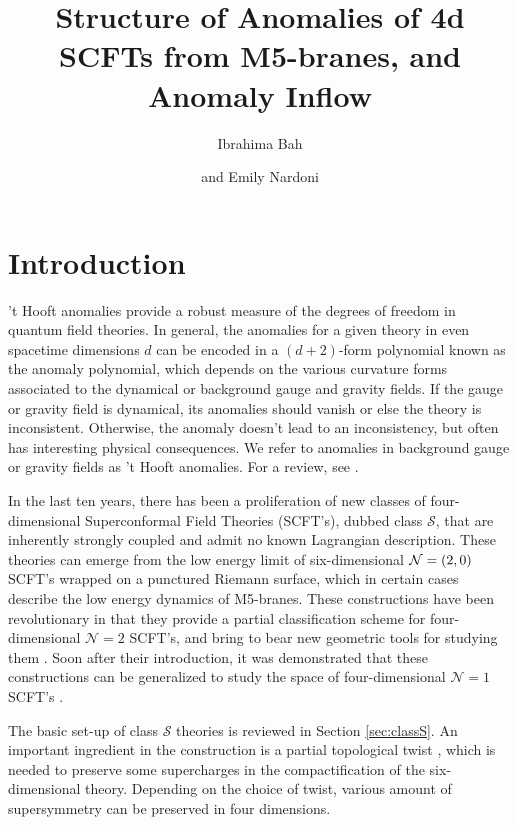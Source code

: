 \documentclass[a4paper,11pt]{article}
\title{\boldmath 	Structure of Anomalies of 4d SCFTs from M5-branes, and Anomaly Inflow}
\author[a]{Ibrahima Bah}
\author[b]{and Emily Nardoni}
\affiliation[a]{Department of Physics and Astronomy, Johns Hopkins University, 3400 North Charles Street, Baltimore, MD 21218, USA}
\affiliation[b]{Department of Physics, University of California, San
Diego, La Jolla, CA 92093, USA}
\def\CN{{\cal N}}
\begin{document}
 

\maketitle
\flushbottom



\newpage

\section{Introduction}


't Hooft anomalies provide a robust measure of the degrees of freedom in quantum field theories. 
In general, the anomalies for a given theory in even spacetime dimensions $d$ can be encoded in a $(d+2)$-form polynomial known as the anomaly polynomial, which depends on  the various curvature forms associated to the dynamical or background gauge and gravity fields. If the gauge or gravity field is dynamical, its anomalies should vanish or else the theory is inconsistent. Otherwise, the anomaly doesn't lead to an inconsistency, but often has interesting physical consequences. We refer to anomalies in background gauge or gravity fields as 't Hooft anomalies. For a review, see \cite{AlvarezGaume:1984dr,Harvey:2005it}.    

In the last ten years, there has been a proliferation of new classes of four-dimensional Superconformal Field Theories (SCFT's), dubbed class $\mathcal{S}$, that are inherently strongly coupled and admit no known Lagrangian description.  These theories can emerge from the low energy limit of six-dimensional $\CN=(2,0)$ SCFT's wrapped on a punctured Riemann surface, which in certain cases describe the low energy dynamics of M5-branes.  These constructions have been revolutionary in that they provide a partial classification scheme for four-dimensional $\mathcal{N}=2$ SCFT's, and bring to bear new geometric tools for studying them \cite{Gaiotto:2009we,Gaiotto:2009gz,Gaiotto:2009hg}.  Soon after their introduction, it was demonstrated that these constructions can be generalized to study the space of four-dimensional $\mathcal{N}=1$ SCFT's \cite{Maruyoshi:2009uk,Benini:2009mz,Bah:2011je,Bah:2011vv,Bah:2012dg,Beem:2012yn}. 


The basic set-up of class $\mathcal{S}$ theories is reviewed in Section \ref{sec:classS}.  An important ingredient in the construction is a partial topological twist \cite{Witten:1988ze,Bershadsky:1995qy}, which is needed to preserve some supercharges in the compactification of the six-dimensional theory.  Depending on the choice of twist, various amount of supersymmetry can be preserved in four dimensions.  
\end{document}
